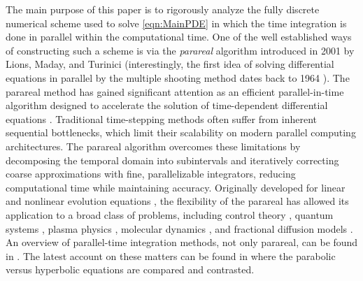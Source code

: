 \documentclass[12pt,a4paper]{article}
\begin{document}
The main purpose of this paper is to rigorously analyze the fully discrete numerical scheme used to solve \eqref{eqn:MainPDE} in which the time integration is done in parallel within the computational time. One of the well established ways of constructing such a scheme is via the \textit{parareal} algorithm introduced in 2001 by Lions, Maday, and Turinici \cite{lions2001resolution} (interestingly, the first idea of solving differential equations in parallel by the multiple shooting method dates back to 1964 \cite{nievergelt1964parallel}). The parareal method has gained significant attention as an efficient parallel-in-time algorithm designed to accelerate the solution of time-dependent differential equations \cite{gander2007analysis}. Traditional time-stepping methods often suffer from inherent sequential bottlenecks, which limit their scalability on modern parallel computing architectures. The parareal algorithm overcomes these limitations by decomposing the temporal domain into subintervals and iteratively correcting coarse approximations with fine, parallelizable integrators, reducing computational time while maintaining accuracy. Originally developed for linear and nonlinear evolution equations \cite{lions2001resolution}, the flexibility of the parareal has allowed its application to a broad class of problems, including control theory \cite{maday2002parareal}, quantum systems \cite{maday2007monotonic}, plasma physics \cite{reynolds2013analytic}, molecular dynamics \cite{baffico2002parallel}, and fractional diffusion models \cite{xu2015parareal, fu2019preconditioned, wu2017fast}. An overview of parallel-time integration methods, not only parareal, can be found in \cite{gander201550, ong2020applications}. The latest account on these matters can be found in \cite{gander2025time} where the parabolic versus hyperbolic equations are compared and contrasted. 
\end{document}
